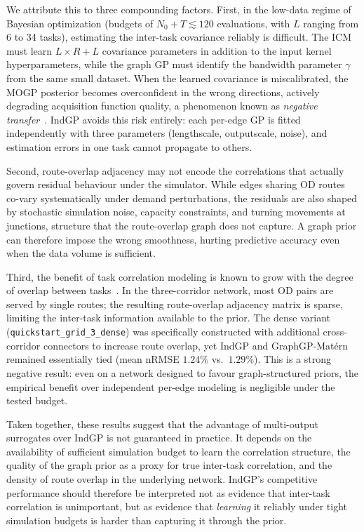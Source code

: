\documentclass[11pt]{article}
\begin{document}
We attribute this to three compounding factors. First, in the low-data regime of Bayesian optimization (budgets of $N_0 + T \lesssim 120$ evaluations, with $L$ ranging from 6 to 34 tasks), estimating the inter-task covariance reliably is difficult. The ICM must learn $L \times R + L$ covariance parameters in addition to the input kernel hyperparameters, while the graph GP must identify the bandwidth parameter $\gamma$ from the same small dataset. When the learned covariance is miscalibrated, the MOGP posterior becomes overconfident in the wrong directions, actively degrading acquisition function quality, a phenomenon known as \emph{negative transfer}~\parencite{liu2018}. IndGP avoids this risk entirely: each per-edge GP is fitted independently with three parameters (lengthscale, outputscale, noise), and estimation errors in one task cannot propagate to others.

Second, route-overlap adjacency may not encode the correlations that actually govern residual behaviour under the simulator. While edges sharing OD routes co-vary systematically under demand perturbations, the residuals are also shaped by stochastic simulation noise, capacity constraints, and turning movements at junctions, structure that the route-overlap graph does not capture. A graph prior can therefore impose the wrong smoothness, hurting predictive accuracy even when the data volume is sufficient.

Third, the benefit of task correlation modeling is known to grow with the degree of overlap between tasks~\parencite{alvarez2012kernels}. In the three-corridor network, most OD pairs are served by single routes; the resulting route-overlap adjacency matrix is sparse, limiting the inter-task information available to the prior. The dense variant (\texttt{quickstart\_grid\_3\_dense}) was specifically constructed with additional cross-corridor connectors to increase route overlap, yet IndGP and GraphGP-Mat\'ern remained essentially tied (mean nRMSE $1.24\%$ vs.\ $1.29\%$). This is a strong negative result: even on a network designed to favour graph-structured priors, the empirical benefit over independent per-edge modeling is negligible under the tested budget.

Taken together, these results suggest that the advantage of multi-output surrogates over IndGP is not guaranteed in practice. It depends on the availability of sufficient simulation budget to learn the correlation structure, the quality of the graph prior as a proxy for true inter-task correlation, and the density of route overlap in the underlying network. IndGP's competitive performance should therefore be interpreted not as evidence that inter-task correlation is unimportant, but as evidence that \emph{learning} it reliably under tight simulation budgets is harder than capturing it through the prior.
\end{document}
